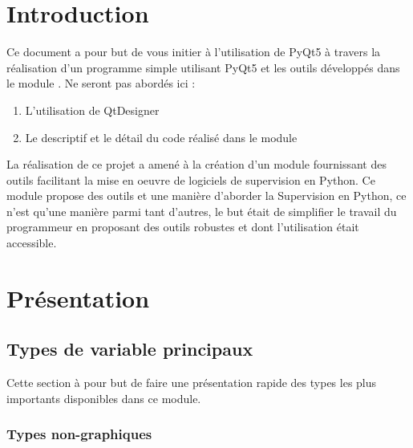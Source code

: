 \chapter{Introduction}

Ce document a pour but de vous initier à l'utilisation de PyQt5 à travers la réalisation d'un programme simple utilisant PyQt5 et les outils développés dans le module .\newline
Ne seront pas abordés ici :
\begin{enumerate}
\item L'utilisation de QtDesigner
\item Le descriptif et le détail du code réalisé dans le module 
\end{enumerate}


La réalisation de ce projet a amené à la création d'un module  fournissant des outils facilitant la mise en oeuvre de logiciels de supervision en Python.\newline
Ce module propose des outils et une manière d'aborder la Supervision en Python, ce n'est qu'une manière parmi tant d'autres, le but était de simplifier le travail du programmeur en proposant des outils robustes et dont l'utilisation était accessible.


\chapter{Présentation}

\section{Types de variable principaux}

Cette section à pour but de faire une présentation rapide des types les plus importants disponibles dans ce module.

\subsection{Types non-graphiques}

